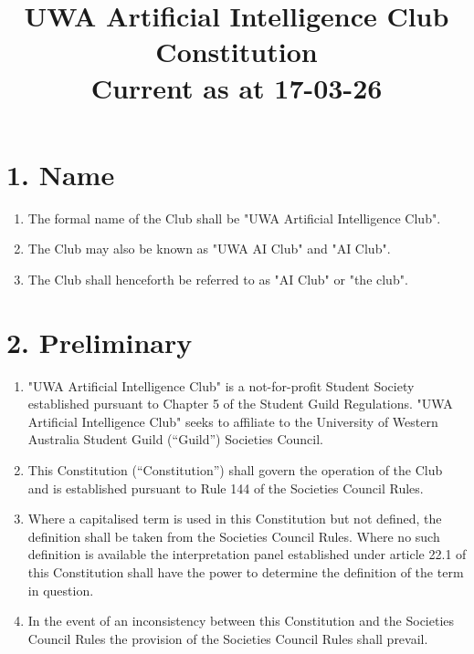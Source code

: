 \documentclass[12pt]{article}
\title{UWA Artificial Intelligence Club Constitution\\
\large Current as at 17-03-26}
\date{}
\renewcommand{\contentsname}{\normalsize\textbf{Table of Contents}}
\begin{document}
\maketitle
\vspace{-8em} 
\renewcommand{\contentsname}{}
\tableofcontents
\clearpage
\normalsize
\section{1. Name}
\begin{enumerate}[label=1.\arabic*]
 \item The formal name of the Club shall be "UWA Artificial Intelligence Club".
 \item The Club may also be known as "UWA AI Club" and "AI Club".
 \item The Club shall henceforth be referred to as "AI Club" or "the club".
\end{enumerate}

\section{2. Preliminary}
\begin{enumerate}[label=2.\arabic*]
 \item "UWA Artificial Intelligence Club" is a not-for-profit Student Society established pursuant to Chapter 5 of the Student Guild Regulations. "UWA Artificial Intelligence Club" seeks to affiliate to the University of Western Australia Student Guild (“Guild”) Societies Council.
 \item This Constitution (“Constitution”) shall govern the operation of the Club and is established pursuant to Rule 144 of the Societies Council Rules.
\item Where a capitalised term is used in this Constitution but not defined, the definition shall be taken from the Societies Council Rules. Where no such definition is available the interpretation panel established under article 22.1 of this Constitution shall have the power to determine the definition of the term in question.
\item In the event of an inconsistency between this Constitution and the Societies Council Rules the provision of the Societies Council Rules shall prevail.
\end{enumerate}
\end{document}
